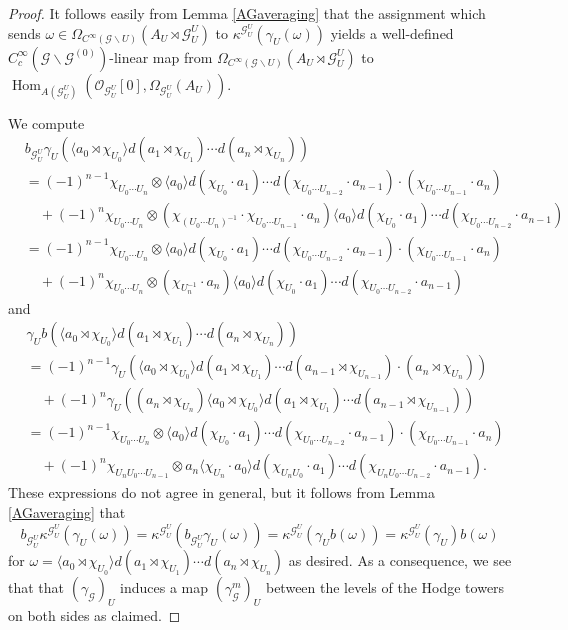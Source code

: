 \documentclass{amsart}
\newcommand{\G}{\mathcal{G}}
\renewcommand{\O}{\mathcal{O}}
\newcommand{\ccinfty}{C_c^\infty}
\newcommand{\cinfty}{C^\infty}
\DeclareMathOperator{\Hom}{Hom}
\begin{document}
\begin{proof}
It follows easily from Lemma \ref{AGaveraging} that the assignment which sends $ \omega \in \Omega_{\cinfty(\G \backslash U)}(A_U \rtimes \G_U^U) $ 
to $ \kappa^{\G_U^U}(\gamma_U(\omega)) $ yields a well-defined $ \ccinfty(\G \backslash \G^{(0)}) $-linear 
map from $ \Omega_{\cinfty(\G \backslash U)}(A_U \rtimes \G_U^U) $ to $ \Hom_{A(\G^U_U)}(\O_{\G^U_U}[0], \Omega_{\G^U_U}(A_U)) $. 

We compute 
\begin{align*}
&b_{\G_U^U} \gamma_U(\langle a_0 \rtimes \chi_{U_0} \rangle d(a_1 \rtimes \chi_{U_1}) \cdots d(a_n \rtimes \chi_{U_n})) \\
&= (-1)^{n - 1} \chi_{U_0 \cdots U_n} \otimes \langle a_0 \rangle d(\chi_{U_0} \cdot a_1) \cdots d(\chi_{U_0 \cdots U_{n - 2}} \cdot a_{n - 1}) \cdot (\chi_{U_0 \cdots U_{n - 1}} \cdot a_n) \\
&\quad+(-1)^n \chi_{U_0 \cdots U_n} \otimes (\chi_{(U_0 \cdots U_n)^{-1}} \cdot \chi_{U_0 \cdots U_{n - 1}} \cdot a_n) \langle a_0 \rangle d(\chi_{U_0} \cdot a_1) \cdots d(\chi_{U_0 \cdots U_{n - 2}} \cdot a_{n - 1}) \\
&= (-1)^{n - 1} \chi_{U_0 \cdots U_n} \otimes \langle a_0 \rangle d(\chi_{U_0} \cdot a_1) \cdots d(\chi_{U_0 \cdots U_{n - 2}} \cdot a_{n - 1}) \cdot (\chi_{U_0 \cdots U_{n - 1}} \cdot a_n) \\
&\quad + (-1)^n \chi_{U_0 \cdots U_n} \otimes (\chi_{U_n^{-1}} \cdot a_n) \langle a_0 \rangle d(\chi_{U_0} \cdot a_1) \cdots d(\chi_{U_0 \cdots U_{n - 2}} \cdot a_{n - 1})
\end{align*} 
and 
\begin{align*} 
&\gamma_U b(\langle a_0 \rtimes \chi_{U_0} \rangle d(a_1 \rtimes \chi_{U_1}) \cdots d(a_n \rtimes \chi_{U_n})) \\
&= (-1)^{n - 1} \gamma_U(\langle a_0 \rtimes \chi_{U_0} \rangle d(a_1 \rtimes \chi_{U_1}) \cdots d(a_{n - 1} \rtimes \chi_{U_{n - 1}}) \cdot (a_n \rtimes \chi_{U_n})) \\
&\quad +(-1)^n \gamma_U((a_n \rtimes \chi_{U_n}) \langle a_0 \rtimes \chi_{U_0} \rangle d(a_1 \rtimes \chi_{U_1}) \cdots d(a_{n - 1} \rtimes \chi_{U_{n - 1}})) \\
&= (-1)^{n - 1} \chi_{U_0 \cdots U_n} \otimes \langle a_0 \rangle d(\chi_{U_0} \cdot a_1) \cdots d(\chi_{U_0 \cdots U_{n - 2}} \cdot a_{n - 1}) \cdot (\chi_{U_0 \cdots U_{n - 1}} \cdot a_n) \\
&\quad+(-1)^n \chi_{U_n U_0 \cdots U_{n - 1}} \otimes a_n \langle \chi_{U_n} 
\cdot a_0 \rangle d(\chi_{U_n U_0} \cdot a_1) \cdots d(\chi_{U_n U_0 \cdots U_{n - 2}} \cdot a_{n - 1}). 
\end{align*}
These expressions do not agree in general, but it follows from Lemma \ref{AGaveraging} that 
$$ 
b_{\G_U^U} \kappa^{\G_U^U}(\gamma_U(\omega)) = \kappa^{\G_U^U}(b_{\G_U^U} \gamma_U(\omega)) = \kappa^{\G_U^U}(\gamma_U b(\omega))  = \kappa^{\G_U^U}(\gamma_U) b(\omega)
$$  
for $ \omega = \langle a_0 \rtimes \chi_{U_0} \rangle d(a_1 \rtimes \chi_{U_1}) \cdots d(a_n \rtimes \chi_{U_n}) $ as desired. 
As a consequence, we see that that $ (\gamma_\G)_U $ induces a map $ (\gamma_\G^m)_U $ between the levels of the Hodge towers on both sides as claimed. 


\end{proof}
\end{document}

